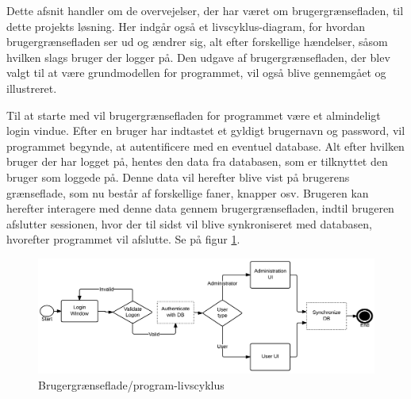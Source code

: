Dette afsnit handler om de overvejelser, der har været om brugergrænsefladen, til dette projekts løsning. Her indgår også et livscyklus-diagram, for hvordan brugergrænsefladen ser ud og ændrer sig, alt efter forskellige hændelser, såsom hvilken slags bruger der logger på. Den udgave af brugergrænsefladen, der blev valgt til at være grundmodellen for programmet, vil også blive gennemgået og illustreret.

Til at starte med vil brugergrænsefladen for programmet være et almindeligt login vindue. Efter en bruger har indtastet et gyldigt brugernavn og password, vil programmet begynde, at autentificere med en eventuel database. Alt efter hvilken bruger der har logget på, hentes den data fra databasen, som er tilknyttet den bruger som loggede på. Denne data vil herefter blive vist på brugerens grænseflade, som nu består af forskellige faner, knapper osv. Brugeren kan herefter interagere med denne data gennem brugergrænsefladen, indtil brugeren afslutter sessionen, hvor der til sidst vil blive synkroniseret med databasen, hvorefter programmet vil afslutte. Se på figur \ref{LifeCycle}.

\begin{figure}[H]
\centering
\includegraphics[width=1\textwidth]{Billeder/LifeCycle.png}
\caption{Brugergrænseflade/program-livscyklus}
\label{LifeCycle}
\end{figure}